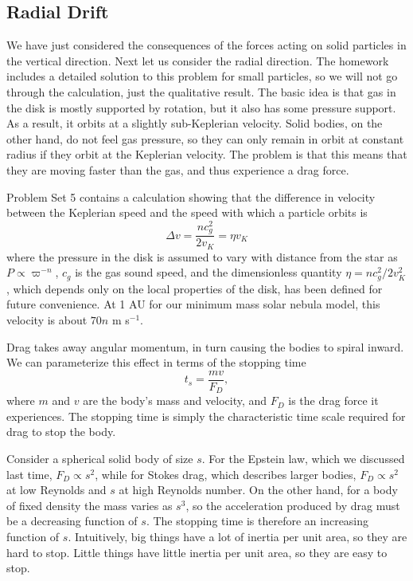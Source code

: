 \subsection{Radial Drift}

We have just considered the consequences of the forces acting on solid particles in the vertical direction. Next let us consider the radial direction. The homework includes a detailed solution to this problem for small particles, so we will not go through the calculation, just the qualitative result. The basic idea is that gas in the disk is mostly supported by rotation, but it also has some pressure support. As a result, it orbits at a slightly sub-Keplerian velocity. Solid bodies, on the other hand, do not feel gas pressure, so they can only remain in orbit at constant radius if they orbit at the Keplerian velocity. The problem is that this means that they are moving faster than the gas, and thus experience a drag force.

Problem Set 5 contains a calculation showing that the difference in velocity between the Keplerian speed and the speed with which a particle orbits is
\begin{equation}
\Delta v = \frac{n c_g^2}{2 v_K} = \eta v_K
\end{equation}
where the pressure in the disk is assumed to vary with distance from the star as $P\propto \varpi^{-n}$, $c_g$ is the gas sound speed, and the dimensionless quantity $\eta = n c_g^2/2 v_K^2$, which depends only on the local properties of the disk, has been defined for future convenience. At 1 AU for our minimum mass solar nebula model, this velocity is about $70 n$ m s$^{-1}$.

Drag takes away angular momentum, in turn causing the bodies to spiral inward. We can parameterize this effect in terms of the stopping time 
\begin{equation}
t_s = \frac{mv}{F_D},
\end{equation}
where $m$ and $v$ are the body's mass and velocity, and $F_D$ is the drag force it experiences. The stopping time is simply the characteristic time scale required for drag to stop the body.

Consider a spherical solid body of size $s$. For the Epstein law, which we discussed last time, $F_D \propto s^2$, while for Stokes drag, which describes larger bodies, $F_D \propto s^2$ at low Reynolds and $s$ at high Reynolds number. On the other hand, for a body of fixed density the mass varies as $s^3$, so the acceleration produced by drag must be a decreasing function of $s$. The stopping time is therefore an increasing function of $s$. Intuitively, big things have a lot of inertia per unit area, so they are hard to stop. Little things have little inertia per unit area, so they are easy to stop.

